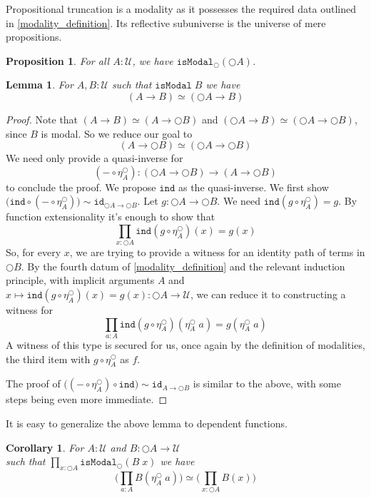 \documentclass[12pt]{report}
\newtheorem{lem}[thm]{Lemma}
\newtheorem{cor}[thm]{Corollary}
\newtheorem{prop}[thm]{Proposition}
\theoremstyle{definition}
\begin{document}
Propositional truncation is a modality as it possesses the required data outlined in \ref{modality_definition}. 
Its reflective subuniverse is the universe of mere propositions.  
\begin{prop}
For all $A  :\mathcal{U}$, we have $\mathtt{isModal}_{\bigcirc}(\bigcirc A)$. 
\end{prop}
\begin{lem}
For $A, B : \mathcal{U}$ such that $\mathtt{isModal}\; B$ we have
$$(A\rightarrow B) \simeq (\bigcirc A \rightarrow B)$$
\end{lem}
\begin{proof}
Note that $(A\rightarrow B) \simeq (A\rightarrow \bigcirc B)$ and $(\bigcirc A \rightarrow B) \simeq (\bigcirc A \rightarrow \bigcirc B)$, since $B$ is modal. 
So we reduce our goal to 
$$(A\rightarrow \bigcirc B) \simeq (\bigcirc A \rightarrow \bigcirc B)$$
We need only provide a quasi-inverse for 
$$(-\circ \eta_A^{\bigcirc}) : (\bigcirc A \rightarrow \bigcirc B) \rightarrow (A\rightarrow \bigcirc B)$$
 to conclude the proof. 
We propose $\mathtt{ind}$ as the quasi-inverse. 
We first show $\big(\mathtt{ind}\circ (-\circ \eta_A^{\bigcirc})\big) \sim \mathtt{id}_{\bigcirc A \rightarrow \bigcirc B}$. 
Let $g : \bigcirc A \rightarrow \bigcirc B$. 
We need $\mathtt{ind}(g\circ \eta_A^\bigcirc ) = g$. 
By function extensionality it's enough to show that 
$$\prod_{x : \bigcirc A}\mathtt{ind}(g\circ \eta_A^\bigcirc )(x) = g(x)$$
So, for every $x$, we are trying to provide a witness for an identity path of terms in $\bigcirc B$. 
By the fourth datum of \ref{modality_definition} and the relevant induction principle, with implicit arguments $A$ and $x\mapsto \mathtt{ind}(g\circ \eta_A^\bigcirc )(x) = g(x) : \bigcirc A \rightarrow \mathcal{U}$, we can reduce it to constructing a witness for
$$\prod_{a : A} \mathtt{ind}(g\circ \eta_A^\bigcirc )(\eta^\bigcirc_{A}\;a) = g(\eta^\bigcirc_{A}\;a)$$
A witness of this type is secured for us, once again by the definition of modalities, the third item with $g \circ \eta_A^\bigcirc $ as $f$. 

The proof of $\big( (-\circ \eta_A^{\bigcirc})\circ \mathtt{ind}\big) \sim \mathtt{id}_{A \rightarrow \bigcirc B}$ 
is similar to the above, with some steps being even more immediate. 
\end{proof}
It is easy to generalize the above lemma to dependent functions.
\begin{cor}
For $A : \mathcal{U}$ and $B : \bigcirc A \rightarrow \mathcal{U}$ \\
such that $\prod_{x : \bigcirc A}\mathtt{isModal}_\bigcirc (B\;x)$ we have
$$\Big(\prod_{a : A}B(\eta_A^\bigcirc \; a)\Big) \simeq \Big( \prod_{x : \bigcirc A}B(x) \Big)$$
\end{cor}
\end{document}
